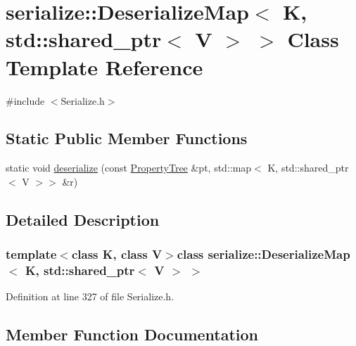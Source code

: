 \hypertarget{classserialize_1_1_deserialize_map_3_01_k_00_01std_1_1shared__ptr_3_01_v_01_4_01_4}{}\section{serialize\+:\+:Deserialize\+Map$<$ K, std\+:\+:shared\+\_\+ptr$<$ V $>$ $>$ Class Template Reference}
\label{classserialize_1_1_deserialize_map_3_01_k_00_01std_1_1shared__ptr_3_01_v_01_4_01_4}


{\ttfamily \#include $<$Serialize.\+h$>$}

\subsection*{Static Public Member Functions}
\begin{DoxyCompactItemize}
\item 
static void \hyperlink{classserialize_1_1_deserialize_map_3_01_k_00_01std_1_1shared__ptr_3_01_v_01_4_01_4_ad2807cf1ee4670cbda806ad46c57f360}{deserialize} (const \hyperlink{namespacesolar__core_adeda2737d6938c190eb774a5b2495045}{Property\+Tree} \&pt, std\+::map$<$ K, std\+::shared\+\_\+ptr$<$ V $>$$>$ \&r)
\end{DoxyCompactItemize}


\subsection{Detailed Description}
\subsubsection*{template$<$class K, class V$>$class serialize\+::\+Deserialize\+Map$<$ K, std\+::shared\+\_\+ptr$<$ V $>$ $>$}



Definition at line 327 of file Serialize.\+h.



\subsection{Member Function Documentation}
\hypertarget{classserialize_1_1_deserialize_map_3_01_k_00_01std_1_1shared__ptr_3_01_v_01_4_01_4_ad2807cf1ee4670cbda806ad46c57f360}{}
